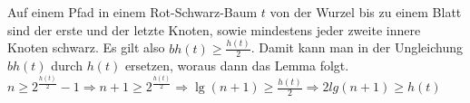 \documentclass[a4paper,12pt]{article}
\begin{document}
\noindent Auf einem Pfad in einem Rot-Schwarz-Baum $t$ von der Wurzel bis zu einem Blatt sind der erste und der letzte Knoten, sowie mindestens jeder zweite innere Knoten schwarz. Es gilt also $\mathit{bh(t)} \geq \frac{h(t)}{2}$. 
Damit kann man in der Ungleichung $\mathit{bh(t)}$ durch $\mathit{h(t)}$ ersetzen, woraus dann das Lemma folgt.\\
$n \geq 2^{\frac{\mathit{h(t)}}{2}} - 1 \Rightarrow n + 1 \geq 2^{\frac{\mathit{h(t)}}{2}} \Rightarrow
\lg(n + 1) \geq \frac{h(t)}{2} \Rightarrow 2 lg(n + 1) \geq h(t) $ 
 









\newpage


\end{document}
